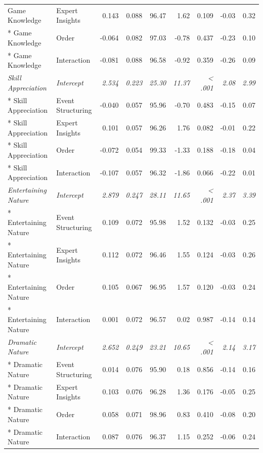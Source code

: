 \begin{longtable}{l l r r r r r r r}
  Game Knowledge & Expert Insights & 0.143 & 0.088 & 96.47 & 1.62 & 0.109 & -0.03 & 0.32\\*
  Game Knowledge & Order & -0.064 & 0.082 & 97.03 & -0.78 & 0.437 & -0.23 & 0.10\\*
  Game Knowledge & Interaction & -0.081 & 0.088 & 96.58 & -0.92 & 0.359 & -0.26 & 0.09\\
  \addlinespace
  \textit{Skill Appreciation} & \textit{Intercept} & \textit{2.534} & \textit{0.223} & \textit{25.30} & \textit{11.37} & \textit{< .001} & \textit{2.08} & \textit{2.99}\\*
  Skill Appreciation & Event Structuring & -0.040 & 0.057 & 95.96 & -0.70 & 0.483 & -0.15 & 0.07\\*
  Skill Appreciation & Expert Insights & 0.101 & 0.057 & 96.26 & 1.76 & 0.082 & -0.01 & 0.22\\*
  Skill Appreciation & Order & -0.072 & 0.054 & 99.33 & -1.33 & 0.188 & -0.18 & 0.04\\*
  Skill Appreciation & Interaction & -0.107 & 0.057 & 96.32 & -1.86 & 0.066 & -0.22 & 0.01\\
  \addlinespace
  \textit{Entertaining Nature} & \textit{Intercept} & \textit{2.879} & \textit{0.247} & \textit{28.11} & \textit{11.65} & \textit{< .001} & \textit{2.37} & \textit{3.39}\\*
  Entertaining Nature & Event Structuring & 0.109 & 0.072 & 95.98 & 1.52 & 0.132 & -0.03 & 0.25\\*
  Entertaining Nature & Expert Insights & 0.112 & 0.072 & 96.46 & 1.55 & 0.124 & -0.03 & 0.26\\*
  Entertaining Nature & Order & 0.105 & 0.067 & 96.95 & 1.57 & 0.120 & -0.03 & 0.24\\*
  Entertaining Nature & Interaction & 0.001 & 0.072 & 96.57 & 0.02 & 0.987 & -0.14 & 0.14\\
  \addlinespace
  \textit{Dramatic Nature} & \textit{Intercept} & \textit{2.652} & \textit{0.249} & \textit{23.21} & \textit{10.65} & \textit{< .001} & \textit{2.14} & \textit{3.17}\\*
  Dramatic Nature & Event Structuring & 0.014 & 0.076 & 95.90 & 0.18 & 0.856 & -0.14 & 0.16\\*
  Dramatic Nature & Expert Insights & 0.103 & 0.076 & 96.28 & 1.36 & 0.176 & -0.05 & 0.25\\*
  Dramatic Nature & Order & 0.058 & 0.071 & 98.96 & 0.83 & 0.410 & -0.08 & 0.20\\*
  Dramatic Nature & Interaction & 0.087 & 0.076 & 96.37 & 1.15 & 0.252 & -0.06 & 0.24\\

\end{longtable}
